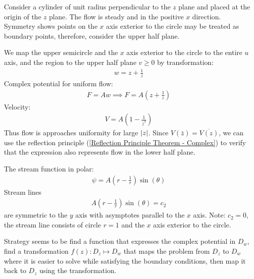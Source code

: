 \documentclass[12pt, english]{book}
\begin{document}
	\begin{example}
		\label{Flow around a cylinder Example - Complex}
		\label{Flow! Around a cylinder}
		Consider a cylinder of unit radius perpendicular to the \(z\) plane and placed at the origin of the \(z\) plane. The flow is steady and in the positive \(x\) direction. Symmetry shows points on the \(x\) axis exterior to the circle may be treated as boundary points, therefore, consider the upper half plane. 
		
		We map the upper semicircle and the \(x\) axis exterior to the circle to the entire \(u\) axis, and the region to the upper half plane \(v \geq 0\) by transformation:
		\begin{align*}
			w = z + \frac{1}{z}
		\end{align*}
		Complex potential for uniform flow:
		\begin{align*}
			F = Aw \implies F = A\left( z + \frac{1}{z} \right)
		\end{align*}
		Velocity:
		\begin{align*}
			V = A \left(1 - \frac{1}{\bar{z}^2}\right)
		\end{align*}
		Thus flow is approaches uniformity for large \(\abs{z}\). Since \(V(\bar{z}) = \overline{V(z)}\), we can use the reflection principle (\cref{Reflection Principle Theorem - Complex}) to verify that the expression also represents flow in the lower half plane.
		
		The stream function in polar:
		\begin{align*}
			\psi = A \left(r - \frac{1}{r}\right) \sin(\theta)
		\end{align*}
		Stream lines
		\begin{align*}
			A \left( r - \frac{1}{r}\right) \sin(\theta) = c_2
		\end{align*}
		are symmetric to the \(y\) axis with asymptotes parallel to the \(x\) axis. Note:
		\(c_2 = 0\), the stream line consists of circle \(r = 1\) and the \(x\) axis exterior to the circle.
	\end{example}

	\begin{observation}
		Strategy seems to be find a function that expresses the complex potential in \(D_w\), find a transformation \(f(z): D_z \mapsto D_w\) that maps the problem from \(D_z\) to \(D_w\) where it is easier to solve while satisfying the boundary conditions, then map it back to \(D_z\) using the transformation. 
	\end{observation}
	
\end{document}
